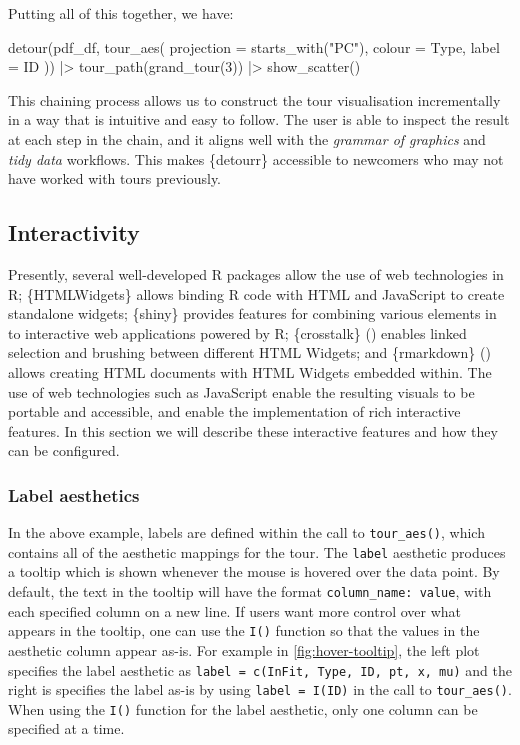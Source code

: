 Putting all of this together, we have:

\begin{Schunk}
\begin{Sinput}
detour(pdf_df, tour_aes(
    projection = starts_with("PC"),
    colour = Type,
    label = ID
)) |>
    tour_path(grand_tour(3)) |>
    show_scatter()
\end{Sinput}
\end{Schunk}

This chaining process allows us to construct the tour visualisation
incrementally in a way that is intuitive and easy to follow. The user is
able to inspect the result at each step in the chain, and it aligns well
with the \emph{grammar of graphics} and \emph{tidy data} workflows. This
makes \{detourr\} accessible to newcomers who may not have worked with
tours previously.

\hypertarget{interactivity}{%
\subsection{Interactivity}\label{interactivity}}

Presently, several well-developed R packages allow the use of web
technologies in R; \{HTMLWidgets\} allows binding R code with HTML and
JavaScript to create standalone widgets; \{shiny\} provides features for
combining various elements in to interactive web applications powered by
R; \{crosstalk\} (\citet{crosstalk}) enables linked selection and
brushing between different HTML Widgets; and \{rmarkdown\}
(\citet{rmarkdown}) allows creating HTML documents with HTML Widgets
embedded within. The use of web technologies such as JavaScript enable
the resulting visuals to be portable and accessible, and enable the
implementation of rich interactive features. In this section we will
describe these interactive features and how they can be configured.

\hypertarget{label-aesthetics}{%
\subsubsection{Label aesthetics}\label{label-aesthetics}}

In the above example, labels are defined within the call to
\texttt{tour\_aes()}, which contains all of the aesthetic mappings for
the tour. The \texttt{label} aesthetic produces a tooltip which is shown
whenever the mouse is hovered over the data point. By default, the text
in the tooltip will have the format \texttt{column\_name:\ value}, with
each specified column on a new line. If users want more control over
what appears in the tooltip, one can use the \texttt{I()} function so
that the values in the aesthetic column appear as-is. For example in
\ref{fig:hover-tooltip}, the left plot specifies the label aesthetic as
\texttt{label\ =\ c(InFit,\ Type,\ ID,\ pt,\ x,\ mu)} and the right is
specifies the label as-is by using \texttt{label\ =\ I(ID)} in the call
to \texttt{tour\_aes()}. When using the \texttt{I()} function for the
label aesthetic, only one column can be specified at a time.


